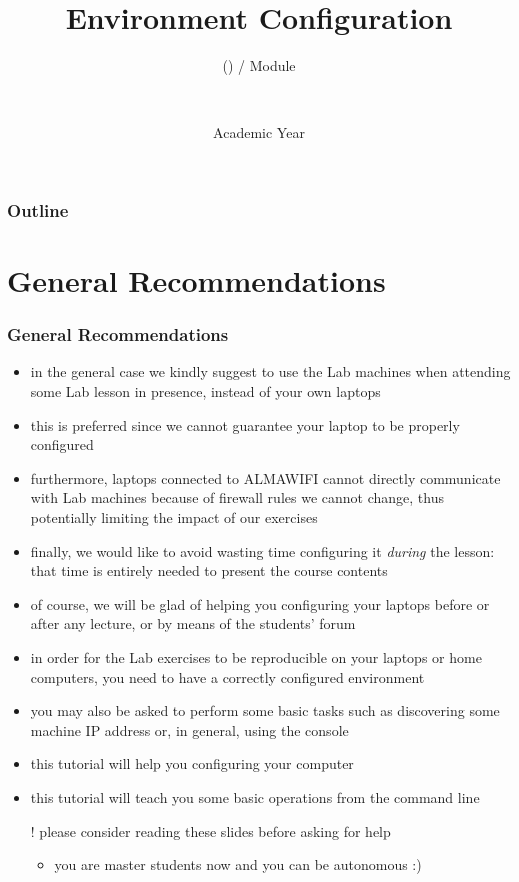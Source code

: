 \documentclass[presentation]{beamer}\mode<presentation>{\usetheme{AMSBolognaFC}}
\title[\currentLab{} -- Env. Config.]{
    Environment Configuration
}
\subtitle{\courseName{} (\courseAcronym) / Module \moduleN{}}
\author[\sspeaker{\gcShort} \& \mmShort]{
    \speaker{\gcFull} \and \mmFull
    \\ 
    \gcEmail \and \mmEmail
}
\institute[\disiShort, \uniboShort]{\disi{} (\disiShort)\\\unibo}
\date[A.Y. \academicYear{}]{Academic Year \academicYear{}}
\begin{document}
\maketitle

\begin{frame}[c]\frametitle{Outline}
    \tableofcontents[sectionstyle=show/show, subsectionstyle=show/show, subsubsectionstyle=hide/hide]
\end{frame}

\section{General Recommendations}

\begin{frame}[allowframebreaks]
\frametitle{General Recommendations}

    \begin{itemize}
        \item in the general case we kindly suggest to \alert{use the Lab machines} when attending some Lab lesson \alert{in presence}, instead of your own laptops
        \item this is \alert{preferred} since we cannot guarantee your laptop to be properly configured
        \item furthermore, laptops connected to ALMAWIFI cannot directly communicate with Lab machines because of firewall rules we cannot change, thus potentially limiting the impact of our exercises
        \item finally, we would like to avoid wasting time configuring it \emph{during} the lesson: that time is entirely needed to present the course contents
        \item of course, we will be glad of helping you configuring your laptops \alert{before} or \alert{after} any lecture, or by means of the \alert{students' forum}
    \end{itemize}

    \framebreak

    \begin{itemize}
        \item in order for the Lab exercises to be reproducible on your laptops or home computers, you need to have a \alert{correctly configured environment}
        \item you may also be asked to perform some basic tasks such as discovering some machine IP address or, in general, using the console
        \item this tutorial will help you configuring your computer
        \item this tutorial will teach you some basic operations from the command line
        \item[!] please consider reading these slides \alert{before} asking for help
        \begin{itemize}
            \item you are master students now and you can be autonomous :)
        \end{itemize}
    \end{itemize}

\end{frame}
\end{document}
